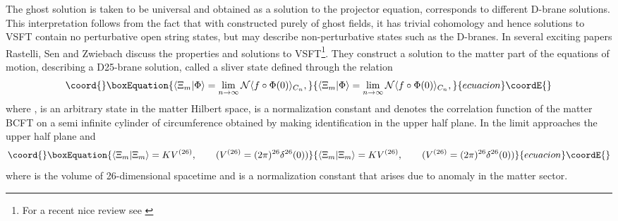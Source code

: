 \documentclass[a4paper,12pt]{article}
\begin{document}
The ghost solution \coordHE{} is taken to be universal and
\coordHE{} obtained as a solution to the projector equation,
corresponds to different D-brane solutions. This interpretation follows from
the fact that with \coordHE{} constructed purely of ghost fields, it has trivial
cohomology and hence solutions to VSFT contain no perturbative open string
states, but may describe non-perturbative states such as the D-branes. In
several exciting papers \cite{rsz2,rsz3,rsz4} Rastelli, Sen and Zwiebach
discuss the properties and solutions to VSFT\footnote{For a recent nice review
see \cite{rsz5}}. They construct a solution to
the matter part of the equations of motion, describing a D25-brane solution,
called a sliver state \coordHE{} defined through the relation
\cite{rsz2,rsz3}
\begin{equation}\coord{}\boxEquation{
\langle\Xi_m|\Phi\rangle= \lim_{n\to\infty}
\mathcal{N}
\langle f\circ\Phi(0)\rangle_{C_n},
\label{v5}
}{
\langle\Xi_m|\Phi\rangle= \lim_{n\to\infty}
\mathcal{N}
\langle f\circ\Phi(0)\rangle_{C_n},
}{ecuacion}\coordE{}\end{equation}
where \coordHE{}, \myHighlight{$|\Phi\rangle$}\coordHE{} is an arbitrary state in the matter
Hilbert space, \coordHE{} is a normalization constant and
\coordHE{} denotes the correlation function of the matter
BCFT on a semi infinite cylinder \coordHE{} of circumference \coordHE{}
obtained
by making identification \coordHE{}
in the upper half \coordHE{} plane. In the \coordHE{} limit \coordHE{} approaches the
upper half plane and
\begin{equation}\coord{}\boxEquation{
\langle\Xi_m|\Xi_m\rangle=KV^{(26)}, \qquad (V^{(26)}=(2\pi)^{26}
\delta^{26}(0))
\label{7}
}{
\langle\Xi_m|\Xi_m\rangle=KV^{(26)}, \qquad (V^{(26)}=(2\pi)^{26}
\delta^{26}(0))
}{ecuacion}\coordE{}\end{equation}
where \coordHE{} is the volume of 26-dimensional spacetime and \coordHE{} is a
normalization constant that arises due to anomaly in the matter sector.
\end{document}
